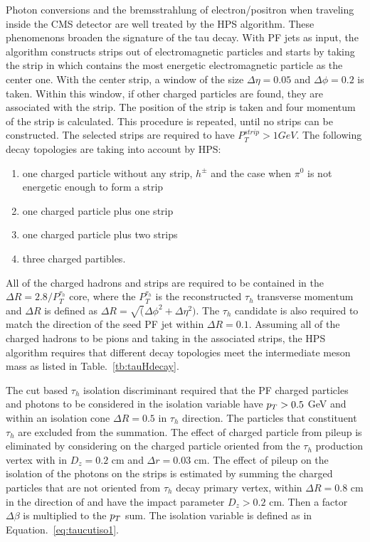 Photon conversions and the bremsstrahlung of electron/positron when traveling inside the CMS detector are well treated by the HPS algorithm. These phenomenons broaden the signature of the tau decay. With PF jets as input, the algorithm constructs strips out of electromagnetic particles and starts by taking the strip in which contains the most energetic electromagnetic particle as the center one. With the center strip, a window of the size $\Delta \eta=0.05$ and $\Delta \phi=0.2$ is taken. Within this window, if other charged particles are found, they are associated with the strip. The position of the strip is taken and four momentum of the strip is calculated. This procedure is repeated, until no strips can be constructed. The selected strips are required to have $P_{T}^{strip}>1GeV$. The following decay topologies are taking into account by HPS:
\begin{enumerate}[$\bullet$]
\item one charged particle without any strip, $h^{\pm}$ and the case when $\pi^{0}$ is not energetic enough to form a strip
\item one charged particle plus one strip
\item one charged particle plus two strips
\item three charged partibles. 
\end{enumerate} 

All of the charged hadrons and strips are required to be contained in the $\Delta R=2.8/P_{T}^{\tau_{h}}$ core, where the $P_{T}^{\tau_{h}}$ is the reconstructed $\tau_{h}$ transverse momentum and $\Delta R$ is defined as $\Delta R=\sqrt(\Delta \phi^{2}+\Delta \eta^{2})$. The $\tau_{h}$ candidate is also required to match the direction of the seed PF jet within $\Delta R=0.1$. Assuming all of the charged hadrons to be pions and taking in the associated strips, the HPS algorithm requires that different decay topologies meet the intermediate meson mass as listed in Table.~\ref{tb:tauHdecay}. 

The cut based $\tau_{h}$ isolation discriminant required that the PF charged particles and photons to be considered in the isolation variable have $p_{T}>0.5$ GeV and within an isolation cone  $\Delta R=0.5$ in $\tau_{h}$ direction. The particles that  constituent $\tau_{h}$ are excluded from the summation. The effect of charged particle from pileup is eliminated by considering on the charged particle oriented from the $\tau_{h}$ production vertex with in $D_{z}=0.2$ cm and $\Delta r=0.03$ cm. The effect of pileup on the isolation of the photons on the strips is estimated by summing the charged particles that are not oriented from $\tau_{h}$ decay primary vertex, within $\Delta R=0.8$ cm in the direction of and have the impact parameter $D_{z}>0.2$ cm. Then a factor $\Delta \beta$ is multiplied to the $p_{T}$ sum. The isolation variable is defined as in Equation.~\ref{eq:taucutiso1}.

